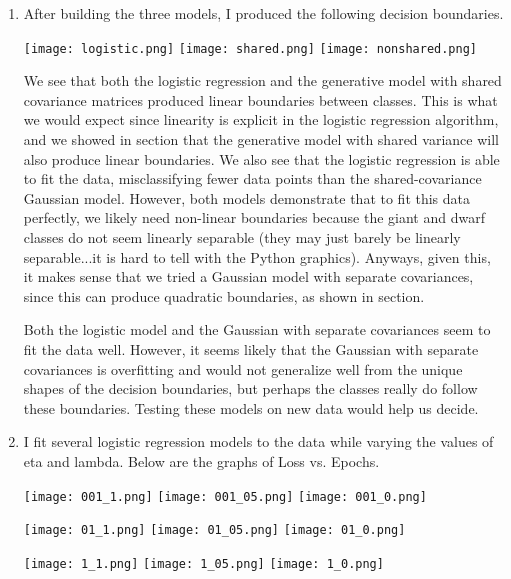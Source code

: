 \documentclass[submit]{harvardml}
\begin{document}
\begin{enumerate}
    \item After building the three models, I produced the following decision boundaries.
    
    \begin{center}
        \texttt{[image: logistic.png]}
        \texttt{[image: shared.png]}
        \texttt{[image: nonshared.png]}
    \end{center}
    
    We see that both the logistic regression and the generative model with shared covariance matrices produced linear boundaries between classes. This is what we would expect since linearity is explicit in the logistic regression algorithm, and we showed in section that the generative model with shared variance will also produce linear boundaries. We also see that the logistic regression is able to fit the data, misclassifying fewer data points than the shared-covariance Gaussian model. However, both models demonstrate that to fit this data perfectly, we likely need non-linear boundaries because the giant and dwarf classes do not seem linearly separable (they may just barely be linearly separable...it is hard to tell with the Python graphics). Anyways, given this, it makes sense that we tried a Gaussian model with separate covariances, since this can produce quadratic boundaries, as shown in section. 
    
    Both the logistic model and the Gaussian with separate covariances seem to fit the data well. However, it seems likely that the Gaussian with separate covariances is overfitting and would not generalize well from the unique shapes of the decision boundaries, but perhaps the classes really do follow these boundaries. Testing these models on new data would help us decide.
    
    \item I fit several logistic regression models to the data while varying the values of eta and lambda. Below are the graphs of Loss vs. Epochs.
    
    \noindent\null\hfill\texttt{[image: 001\_1.png]} \hfill
\texttt{[image: 001\_05.png]} \hfill
\texttt{[image: 001\_0.png]} \hfill\null

\noindent\null\hfill\texttt{[image: 01\_1.png]} \hfill
\texttt{[image: 01\_05.png]}\hfill
\texttt{[image: 01\_0.png]} \hfill\null

\noindent\null\hfill\texttt{[image: 1\_1.png]} \hfill
\texttt{[image: 1\_05.png]}\hfill
\texttt{[image: 1\_0.png]} \hfill\null


\end{enumerate}
\end{document}
